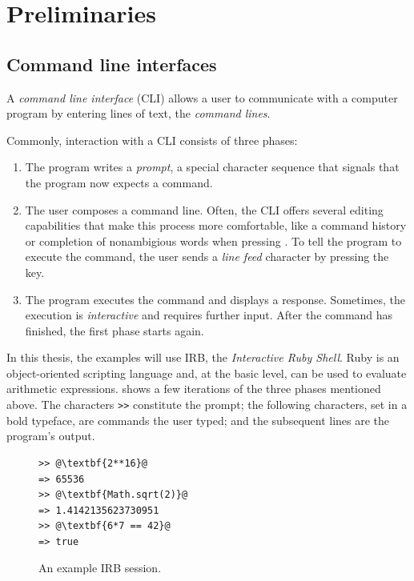 \documentclass[paper=a4,twoside,abstract=on,cleardoublepage=empty,numbers=noenddot,toc=bib,12pt,appendixprefix=true]{scrreprt}
\begin{document}
\chapter{Preliminaries}
\label{sec:preliminaries}

\section{Command line interfaces}
\label{sec:cli}

A \emph{command line interface} (\textsc{CLI}) allows a user to communicate with a computer program by entering lines of text, the \emph{command lines}.

Commonly, interaction with a \textsc{CLI} consists of three phases:

\begin{enumerate}
    \item The program writes a \emph{prompt}, a special character sequence that signals that the program now expects a command.
    \item The user composes a command line. Often, the CLI offers several editing capabilities that make this process more comfortable, like a command history or completion of nonambigious words when pressing . To tell the program to execute the command, the user sends a \emph{line feed} character by pressing the  key.
    \item The program executes the command and displays a response. Sometimes, the execution is \emph{interactive} and requires further input. After the command has finished, the first phase starts again.
\end{enumerate}

In this thesis, the examples will use IRB, the \emph{Interactive Ruby Shell}. Ruby is an object-oriented scripting language and, at the basic level, can be used to evaluate arithmetic expressions.  shows a few iterations of the three phases mentioned above. The characters \texttt{>\->} constitute the prompt; the following characters, set in a bold typeface, are commands the user typed; and the subsequent lines are the program's output.

\begin{figure}[tb]
    \begin{lstlisting}[escapechar=@,frame=shadowbox]
>> @\textbf{2**16}@
=> 65536
>> @\textbf{Math.sqrt(2)}@
=> 1.4142135623730951
>> @\textbf{6*7 == 42}@
=> true
    \end{lstlisting}
    \centering
    \caption{An example IRB session.}
    \label{fig:irb}
\end{figure}
\end{document}
